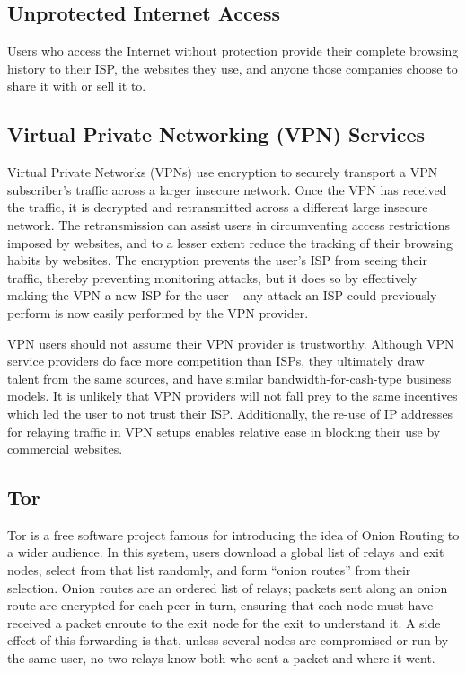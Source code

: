 
\subsection{Unprotected Internet Access}

Users who access the Internet without protection provide their
complete browsing history to their ISP, the websites they use, and
anyone those companies choose to share it with or sell it to.

\subsection{Virtual Private Networking (VPN) Services}

Virtual Private Networks (VPNs) use encryption to securely transport a
VPN subscriber's traffic across a larger insecure network. Once the
VPN has received the traffic, it is decrypted and retransmitted across
a different large insecure network. The retransmission can assist
users in circumventing access restrictions imposed by websites, and to
a lesser extent reduce the tracking of their browsing habits by
websites. The encryption prevents the user's ISP from seeing their
traffic, thereby preventing monitoring attacks, but it does so by
effectively making the VPN a new ISP for the user -- any attack an ISP
could previously perform is now easily performed by the VPN provider.

VPN users should not assume their VPN provider is
trustworthy. Although VPN service providers do face more competition
than ISPs, they ultimately draw talent from the same sources, and have
similar bandwidth-for-cash-type business models. It is unlikely that
VPN providers will not fall prey to the same incentives which led the
user to not trust their ISP. Additionally, the re-use of IP addresses
for relaying traffic in VPN setups enables relative ease in blocking
their use by commercial websites\cite{13}.

\subsection{Tor}

Tor\cite{TOR} is a free software project famous for introducing the
idea of Onion Routing to a wider audience. In this system, users
download a global list of relays and exit nodes, select from that list
randomly, and form ``onion routes'' from their selection. Onion routes
are an ordered list of relays; packets sent along an onion route are
encrypted for each peer in turn, ensuring that each node must have
received a packet enroute to the exit node for the exit to understand
it. A side effect of this forwarding is that, unless several nodes are
compromised or run by the same user, no two relays know both who sent
a packet and where it went.

